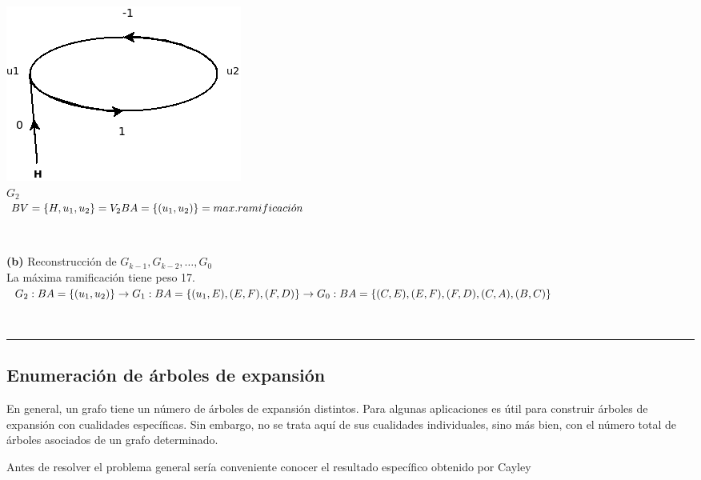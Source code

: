 \documentclass[10pt,a5paper]{book}
\begin{document}
  \parbox{6cm}
  {
    \hspace*{-.5in}\includegraphics[scale=.6]{Fig2_4_a3.png}\\
    \hspace*{.5in} \textbf{$G_2$}\\
    
    $BV = \{H,u_1,u_2\} = V_2 \\
    BA = \{(u_1,u_2)\} = max. ramificaci\acute{o}n$\\
}\hfill\\
\parbox{10cm}
{
  \textbf{(b)} Reconstrucción de $G_{k-1}, G_{k-2}, \ldots, G_0$\\
  La máxima ramificación tiene peso 17.\\

  $G_2: BA = \{(u_1,u_2)\} \rightarrow G_1: \\ BA = \{(u_1,E),(E,F),(F,D)\} \rightarrow G_0: \\ BA = \{(C,E),(E,F),(F,D),(C,A),(B,C)\} $
}\hfill\\
\hrule


\subsection{Enumeración de árboles de expansión}

En general, un grafo tiene un número de árboles de expansión distintos. Para algunas aplicaciones es útil para construir árboles de expansión con cualidades específicas. Sin embargo, no se trata aquí de sus cualidades individuales, sino más bien, con el número total de árboles asociados de un grafo determinado.

Antes de resolver el problema general sería conveniente conocer el resultado específico obtenido por Cayley\cite{c}
\end{document}
